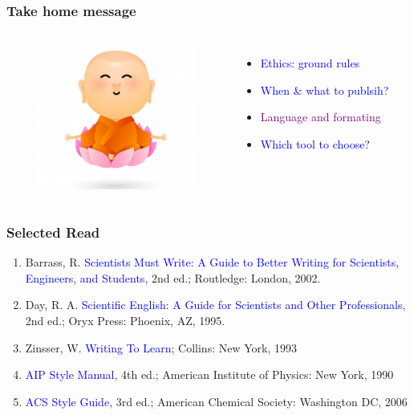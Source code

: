 \documentclass[newPxFont,sthlmFooter]{beamer}
\newcommand{\fs}{\footnotesize}
\begin{document}
\begin{frame}\frametitle{Take home message}
  \begin{columns}[T,onlytextwidth]
  \begin{figure}
    \centering
    \includegraphics[width=2in]{figs/bud} 
  \end{figure}
          \vspace{1.5cm}
  \begin{itemize}
  \fs
	\item \textcolor{blue}{Ethics: ground rules}
	\item \textcolor{blue}{When \& what to publsih?}
	\item \textcolor{purple}{Language and formating}
	\item \textcolor{blue}{Which tool to choose?}
	\end{itemize}
  \vspace{-2cm}
  \end{columns}
\end{frame}

\begin{frame}\frametitle{Selected Read}
  \begin{enumerate}
    \fs
	\item Barrass, R. \textcolor{blue}{Scientists Must Write: A Guide to Better Writing for Scientists, Engineers, and Students,} 2nd ed.; Routledge: London, 2002.
	\item Day, R. A. \textcolor{blue}{Scientific English: A Guide for Scientists and Other Professionals,} 2nd ed.; Oryx Press: Phoenix, AZ, 1995.
	\item Zinsser, W. \textcolor{blue}{Writing To Learn}; Collins: New York, 1993
	\item \textcolor{blue}{AIP Style Manual}, 4th ed.; American Institute of Physics: New York, 1990
	\item \textcolor{blue}{ACS Style Guide}, 3rd ed.; American Chemical Society: Washington DC, 2006
  \end{enumerate}
\end{frame}
\end{document}
